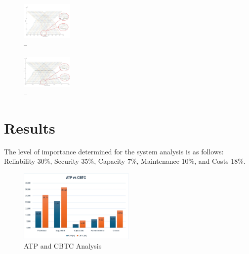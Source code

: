 \documentclass[conference]{IEEEtran}
\begin{document}
\begin{figure}[ht]
    \centering
    \includegraphics[width=0.22\textwidth,scale=1]{Imagenes_general/SIM-9_TIME-25_HW-2_TRAINS-16.jpg}
    \caption{--}
    \label{fig:Simulation 9: 16 Trains / 2 mins headway}
\end{figure}

\begin{figure}[ht]
    \centering
    \includegraphics[width=0.22\textwidth,scale=1]{Imagenes_general/SIM-4_TIME-25_HW-2_TRAINS-18.jpg}
    \caption{--}
    \label{fig:Simulation 4: 18 Trains / 2 mins headway}
\end{figure}


\section{Results}
The level of importance determined for the system analysis is as follows: Reliability 30\%, Security 35\%, Capacity 7\%, Maintenance 10\%, and Costs 18\%.
\begin{figure}[ht]
    \centering
    \includegraphics[width=0.5\textwidth, scale=1]{Imagenes_general/ATP VS CBTC.jpg}
    \caption{ ATP and CBTC Analysis}
    \label{fig:Analysis}
\end{figure}
\end{document}
